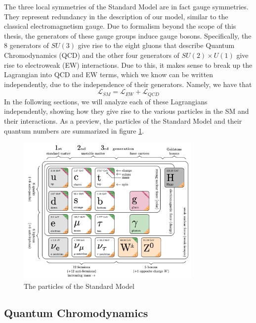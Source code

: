 The three local symmetries of the Standard Model are in fact gauge symmetries. They represent redundancy in the description of our model, similar to the classical electromagnetism gauge. Due to formalism beyond the scope of this thesis, the generators of these gauge groups induce gauge bosons. Specifically, the 8 generators of $SU(3)$ give rise to the eight gluons that describe Quantum Chromodynamics (QCD) and the other four generators of $SU(2) \times U(1)$ give rise to electroweak (EW) interactions. Due to this, it makes sense to break up the Lagrangian into QCD and EW terms, which we know can be written independently, due to the independence of their generators. Namely, we have that
\begin{equation}
\mathcal{L}_{SM} = \mathcal{L}_{EW} + \mathcal{L}_{QCD}
\end{equation}
In the following sections, we will analyze each of these Lagrangians independently, showing how they give rise to the various particles in the SM and their interactions. As a preview, the particles of the Standard Model and their quantum numbers are summarized in figure \ref{fig:particles_of_the_SM}. 

\begin{figure}[ht!]
    \centering
    \includegraphics[width=0.8\textwidth]{figures/chapter2/particles_of_the_SM.png}
    \caption{The particles of the Standard Model}
    \label{fig:particles_of_the_SM}
\end{figure}

\subsection{Quantum Chromodynamics}

